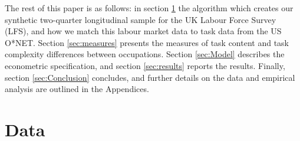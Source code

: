 \documentclass[12pt,authoryear]{elsarticle}
\begin{document}
	
	
	
	
	

	\vspace{2mm}
	
	
	The rest of this paper is as follows: in section \ref{sec:Data} the algorithm which creates our synthetic two-quarter longitudinal sample for the UK Labour Force Survey (LFS), and how we match this labour market data to task data from the US O*NET. Section \ref{sec:measures} presents the measures of task content and task complexity differences between occupations. Section \ref{sec:Model} describes the econometric specification, and section \ref{sec:results} reports the results. Finally, section \ref{sec:Conclusion} concludes, and further details on the data and empirical analysis are outlined in the Appendices.
	
	\section{Data}
	\label{sec:Data}
	
\end{document}
